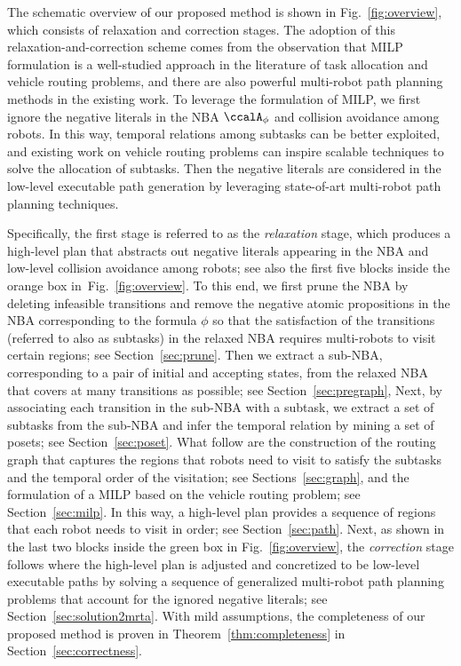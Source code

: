 \documentclass[Afour,sageh,times]{sagej}
\newcommand{\autop}{\ccalA_{\phi}}
\begin{document}
      {The schematic overview of our proposed method is shown in Fig.~\ref{fig:overview}, which consists of relaxation and correction stages.  The adoption of this relaxation-and-correction scheme comes from the observation that MILP formulation is a well-studied approach in the literature of task allocation and vehicle routing problems, and there are also powerful multi-robot path planning methods in the existing work. To leverage the formulation of MILP, we first ignore the negative literals in the NBA $\autop$ and collision avoidance among robots. In this way, temporal relations among subtasks can be better exploited, and existing work on vehicle routing problems can inspire scalable techniques to solve the allocation of subtasks. Then the negative literals are  considered in the low-level executable path generation by leveraging state-of-art multi-robot path planning techniques.

Specifically, the first stage is referred to as the {\it relaxation} stage, which produces a high-level plan that abstracts out negative literals appearing in the NBA and low-level collision avoidance among robots; see also the first five blocks inside the orange box in~Fig.~\ref{fig:overview}. To this end, we first prune the NBA by deleting infeasible transitions and remove the negative atomic propositions in the NBA corresponding to the formula $\phi$ so that the satisfaction of the transitions (referred to also as subtasks) in the relaxed NBA requires multi-robots to visit certain regions; see Section~\ref{sec:prune}. Then we extract a sub-NBA, corresponding to a pair of initial and accepting states, from the relaxed NBA that covers at many transitions as possible; see Section~\ref{sec:pregraph}, Next, by associating each transition in the sub-NBA with a subtask, we extract a set of subtasks from the sub-NBA and infer the temporal relation by mining a set of posets; see Section~\ref{sec:poset}. What follow are the construction of the routing graph that captures the regions that robots need to visit to satisfy the subtasks and the temporal order of the visitation; see Sections~\ref{sec:graph}, and the formulation of a MILP based on the vehicle routing problem; see Section~\ref{sec:milp}. In this way, a high-level plan provides a sequence of regions that each robot needs to visit in order; see Section~\ref{sec:path}. Next, as shown in the last two blocks inside the green box in Fig.~\ref{fig:overview}, the {\it correction} stage follows where the high-level plan is adjusted and concretized to be low-level executable paths by solving a sequence of generalized multi-robot path planning problems that account for the ignored negative literals; see Section~\ref{sec:solution2mrta}. With mild assumptions, the completeness of our proposed method is proven in Theorem~\ref{thm:completeness} in Section~\ref{sec:correctness}.



}
\end{document}
